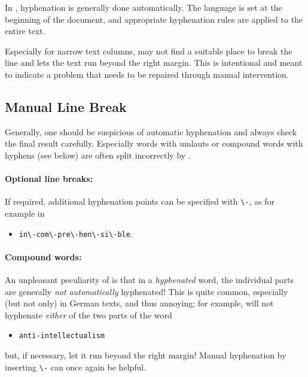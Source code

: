 In \latex, hyphenation is generally done automatically. The language is set at
the beginning of the document, and appropriate hyphenation rules are applied to
the entire text.

Especially for narrow text columns, \latex may not find a suitable place to
break the line and lets the text run beyond the right margin. This is intentional
and meant to indicate a problem that needs to be repaired through manual
intervention.

\subsection{Manual Line Break}

Generally, one should be suspicious of automatic hyphenation and always
check the final result carefully. Especially words with umlauts or compound
words with hyphens (see below) are often split incorrectly by \latex.

\paragraph{Optional line breaks:} If required, additional hyphenation
points can be specified with \verb!\-!, as for example in
%
\begin{itemize}
    \item[] \verb!in\-com\-pre\-hen\-si\-ble!.
\end{itemize}

\paragraph{Compound words:} An unpleasant peculiarity of \latex is that in a
\emph{hyphenated} word, the individual parts are generally \emph{not
automatically} hyphenated! This is quite common, especially (but not only) in
German texts, and thus annoying; for example, \latex will not hyphenate
\emph{either} of the two parts of the word
%
\begin{itemize}
    \item[] \verb!anti-intellectualism!
\end{itemize}
%
but, if necessary, let it run beyond the right margin! Manual hyphenation by
inserting \verb!\-! can once again be helpful.

